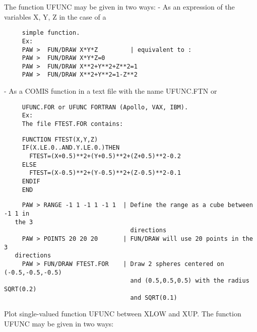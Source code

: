    \par
The function UFUNC may be given in two ways:  - As an expression of the 
   variables X, Y, Z in the case of a 
\begin{verbatim}
     simple function.
     Ex:
     PAW >  FUN/DRAW X*Y*Z         | equivalent to :
     PAW >  FUN/DRAW X*Y*Z=0
     PAW >  FUN/DRAW X**2+Y**2+Z**2=1
     PAW >  FUN/DRAW X**2+Y**2=1-Z**2
\end{verbatim}
   \par
- As a COMIS function in a text file with the name UFUNC.FTN or 
\begin{verbatim}
     UFUNC.FOR or UFUNC FORTRAN (Apollo, VAX, IBM).
     Ex:
     The file FTEST.FOR contains:
\end{verbatim}
\begin{verbatim}
     FUNCTION FTEST(X,Y,Z)
     IF(X.LE.0..AND.Y.LE.0.)THEN
       FTEST=(X+0.5)**2+(Y+0.5)**2+(Z+0.5)**2-0.2
     ELSE
       FTEST=(X-0.5)**2+(Y-0.5)**2+(Z-0.5)**2-0.1
     ENDIF
     END
\end{verbatim}
\begin{verbatim}
     PAW > RANGE -1 1 -1 1 -1 1  | Define the range as a cube between -1 1 in 
   the 3
                                   directions
     PAW > POINTS 20 20 20       | FUN/DRAW will use 20 points in the 3 
   directions
     PAW > FUN/DRAW FTEST.FOR    | Draw 2 spheres centered on (-0.5,-0.5,-0.5)
                                   and (0.5,0.5,0.5) with the radius SQRT(0.2)
                                   and SQRT(0.1)
\end{verbatim}

\ENDCMD


\BEGARG
{}
\ENDARG
{}
\ENDOPT

   \par
Plot single-valued function UFUNC between XLOW and XUP.  The function UFUNC 
   may be given in two ways:  

